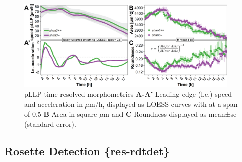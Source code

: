 \documentclass[11pt,singlespacinge,twoside]{reedthesis} %
\begin{document}
\begin{figure}

{\centering \includegraphics[width=0.95\textwidth]{figures/results/03_rosettes/registration} 

}

\caption[pLLP time-resolved morphometrics]{pLLP time-resolved morphometrics \textbf{A-A'} Leading edge (l.e.) speed and acceleration in \(\mu\)m/h, displayed as LOESS curves with at a span of 0.5 \textbf{B} Area in square \(\mu\)m and \textbf{C} Roundness displayed as mean±se (standard error).}\label{fig:rdtreg}
\end{figure}
\hypertarget{rosette-detection-res-rdtdet}{%
\subsection{Rosette Detection \{res-rdtdet\}}\label{rosette-detection-res-rdtdet}}
\end{document}
